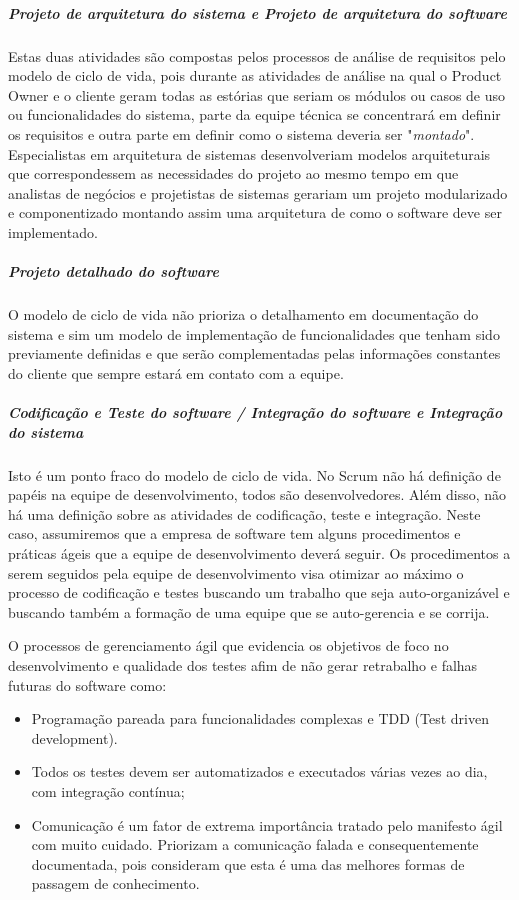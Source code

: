 \subparagraph{Projeto de arquitetura do sistema e Projeto de arquitetura do software}

Estas duas atividades são compostas pelos processos de análise de requisitos pelo modelo de ciclo de vida, pois durante as atividades de análise na qual o Product Owner e o cliente geram todas as estórias que seriam os módulos ou casos de uso ou funcionalidades do sistema, parte da equipe técnica se concentrará em definir os requisitos e outra parte em definir como o sistema deveria ser "\textit{montado}". Especialistas em arquitetura de sistemas desenvolveriam modelos arquiteturais que correspondessem as necessidades do projeto ao mesmo tempo em que analistas de negócios e projetistas de sistemas gerariam um projeto modularizado e componentizado montando assim uma arquitetura de como o software deve ser implementado.

\subparagraph{Projeto detalhado do software}

O modelo de ciclo de vida não prioriza o detalhamento em documentação do sistema e sim um modelo de implementação de funcionalidades que tenham sido previamente definidas e que serão complementadas pelas informações constantes do cliente que sempre estará em contato com a equipe.

\subparagraph{Codificação e Teste do software / Integração do software e Integração do sistema}


Isto é um ponto fraco do modelo de ciclo de vida. No Scrum não há definição de papéis na equipe de desenvolvimento, todos são desenvolvedores. Além disso, não há uma definição sobre as atividades de codificação, teste e integração. Neste caso, assumiremos que a empresa de software tem alguns procedimentos e práticas ágeis que a equipe de desenvolvimento deverá seguir. Os procedimentos a serem seguidos pela equipe de desenvolvimento visa otimizar ao máximo o processo de codificação e testes buscando um trabalho que seja auto-organizável e buscando também a formação de uma equipe que se auto-gerencia e se corrija.

O processos de gerenciamento ágil que evidencia os objetivos de foco no desenvolvimento e qualidade
dos testes afim de não gerar retrabalho e falhas futuras do software como:
\begin{itemize}
  \item Programação pareada para funcionalidades complexas e TDD (Test driven development).
  \item Todos os testes devem ser automatizados e executados várias vezes ao dia, com integração contínua;
  \item Comunicação é um fator de extrema importância tratado pelo manifesto ágil\cite{beck2001agile} com muito cuidado. Priorizam a comunicação falada e consequentemente documentada, pois consideram que esta é uma das melhores formas de passagem de conhecimento.
\end{itemize}

